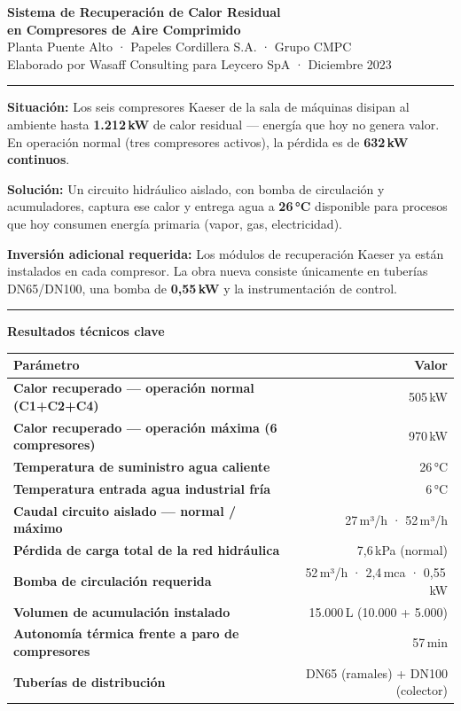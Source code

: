 \documentclass[11pt,a4paper]{article}
\begin{document}
\begin{center}
  {\Large\bfseries\color{navyblue}
    Sistema de Recuperación de Calor Residual\\[0.3em]
    en Compresores de Aire Comprimido}\\[0.5em]
  {\large Planta Puente Alto · Papeles Cordillera S.A. · Grupo CMPC}\\[0.3em]
  {\small Elaborado por Wasaff Consulting para Leycero SpA · Diciembre 2023}
\end{center}

\noindent\rule{\textwidth}{1pt}

\textbf{\color{navyblue}Situación:} Los seis compresores Kaeser de la sala de máquinas
disipan al ambiente hasta \textbf{1.212\,kW} de calor residual — energía que hoy no
genera valor. En operación normal (tres compresores activos), la pérdida es de
\textbf{632\,kW continuos}.

\textbf{\color{navyblue}Solución:} Un circuito hidráulico aislado, con bomba de circulación y
acumuladores, captura ese calor y entrega agua a \textbf{26\,°C} disponible para procesos
que hoy consumen energía primaria (vapor, gas, electricidad).

\textbf{\color{navyblue}Inversión adicional requerida:} Los módulos de recuperación Kaeser
ya están instalados en cada compresor. La obra nueva consiste únicamente en tuberías DN65/DN100,
una bomba de \textbf{0{,}55\,kW} y la instrumentación de control.

\noindent\rule{\textwidth}{0.4pt}

\begin{center}
\textbf{\color{navyblue}Resultados técnicos clave}
\end{center}

\begin{tabular}{@{}>{\bfseries}p{7.5cm}r@{}}
\toprule
Parámetro & Valor \\
\midrule
Calor recuperado — operación normal (C1+C2+C4) & 505\,kW \\
Calor recuperado — operación máxima (6 compresores) & 970\,kW \\
Temperatura de suministro agua caliente & 26\,°C \\
Temperatura entrada agua industrial fría & 6\,°C \\
Caudal circuito aislado — normal / máximo & 27\,m³/h · 52\,m³/h \\
Pérdida de carga total de la red hidráulica & 7{,}6\,kPa (normal) \\
Bomba de circulación requerida & 52\,m³/h · 2{,}4\,mca · 0{,}55\,kW \\
Volumen de acumulación instalado & 15.000\,L (10.000 + 5.000) \\
Autonomía térmica frente a paro de compresores & 57\,min \\
Tuberías de distribución & DN65 (ramales) + DN100 (colector) \\
\bottomrule
\end{tabular}
\end{document}
